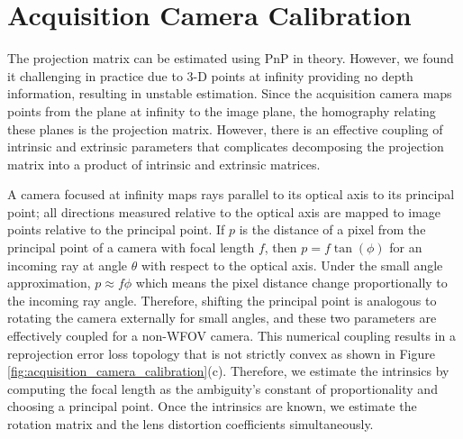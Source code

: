 \section{Acquisition Camera Calibration}
The projection matrix can be estimated using PnP in theory. However, we found it challenging in practice due to 3-D points at infinity providing no depth information, resulting in unstable estimation. Since the acquisition camera maps points from the plane at infinity to the image plane, the homography relating these planes is the projection matrix. However, there is an effective coupling of intrinsic and extrinsic parameters that complicates decomposing the projection matrix into a product of intrinsic and extrinsic matrices.

A camera focused at infinity maps rays parallel to its optical axis to its principal point; all directions measured relative to the optical axis are mapped to image points relative to the principal point. If $p$ is the distance of a pixel from the principal point of a camera with focal length $f$, then $p = f \tan(\phi)$ for an incoming ray at angle $\theta$ with respect to the optical axis. Under the small angle approximation, $p \approx f\phi$ which means the pixel distance change proportionally to the incoming ray angle. Therefore, shifting the principal point is analogous to rotating the camera externally for small angles, and these two parameters are effectively coupled for a non-WFOV camera. This numerical coupling results in a reprojection error loss topology that is not strictly convex as shown in Figure \ref{fig:acquisition_camera_calibration}(c). Therefore, we estimate the intrinsics by computing the focal length as the ambiguity's constant of proportionality and choosing a principal point. Once the intrinsics are known, we estimate the rotation matrix and the lens distortion coefficients simultaneously.

